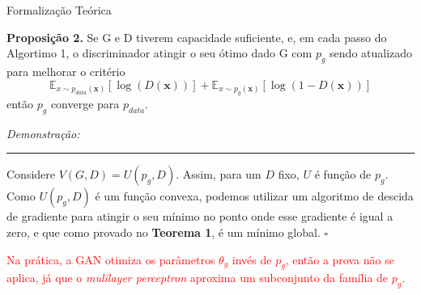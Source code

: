 \documentclass[10pt]{beamer}
\newcommand*{\QEDB}{\hfill\ensuremath{\square}}%
\begin{document}
	




\begin{frame}[fragile]{Formalização Teórica}
	
	\small
	\textbf{Proposição 2.} Se G e D tiverem capacidade suficiente,
	e, em cada passo do Algortimo 1, o discriminador atingir o seu
	ótimo dado G com $p_g$ sendo atualizado para melhorar o critério
    $$
    \mathbb{E}_{x\sim p_{data}(\bm x)}\left[\log{(D(\bm x))}\right]+
    \mathbb{E}_{x\sim p_g(\bm x)}\left[\log(1-D(\bm x) )\right]
    $$
    então $p_g$ converge para $p_{data}$.

	\textit{Demonstração:}
	\hrule
	Considere $V(G,D) = U(p_g,D)$. Assim, para um $D$ fixo, $U$ é
	função de $p_g$.
	Como $U(p_g,D)$ é um função convexa, podemos utilizar um algoritmo
	de descida de gradiente para atingir o seu mínimo no ponto
	onde esse gradiente é igual a zero, e que como provado
	no \textbf{Teorema 1}, é um mínimo global.
	\QEDB
	\pause

	\textcolor{red}{Na prática, a GAN otimiza os parâmetros
	$\theta_g$ invés de $p_g$, então a prova não se aplica,
	já que o \textit{mulilayer perceptron} aproxima um subconjunto
	da família de $p_g$.}

\end{frame}
\AtBeginSection{}
\end{document}
